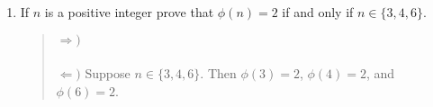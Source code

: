 \documentclass{hw}
\begin{document}
\begin{enumerate}
\item If $n$ is a positive integer prove that $\phi(n)=2$ if and only if $n\in\{ 3,4,6\}$.
\begin{quote}
$\Rightarrow)$
\noindent\\\\
$\Leftarrow)$ Suppose $n\in\{ 3,4,6\}$. Then $\phi(3)=2$, $\phi(4)=2$, and $\phi(6)=2$.
\end{quote}
\end{enumerate}
\end{document}
